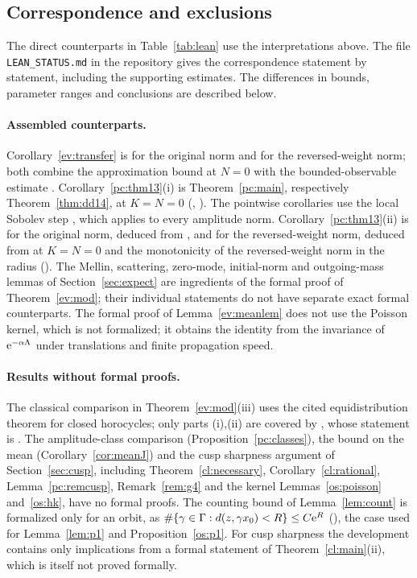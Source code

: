 \subsection{Correspondence and exclusions}
The direct counterparts in Table~\ref{tab:lean} use the interpretations above.
The file \texttt{LEAN\_STATUS.md} in the repository gives the correspondence statement by statement,
including the supporting estimates. The differences in bounds, parameter ranges and conclusions are described below.

\paragraph{Assembled counterparts.}
Corollary~\ref{ev:transfer} is  for the original norm and  for the reversed-weight
norm; both combine the approximation bound at $N=0$ with the bounded-observable estimate .
Corollary~\ref{pc:thm13}(i) is Theorem~\ref{pc:main}, respectively Theorem~\ref{thm:dd14}, at $K=N=0$ (, ). The pointwise
corollaries use the local Sobolev step , which applies to every amplitude norm.
Corollary~\ref{pc:thm13}(ii) is  for the original norm, deduced from , and  for the
reversed-weight norm, deduced from  at $K=N=0$ and the monotonicity of the reversed-weight norm in the radius
(). The Mellin, scattering, zero-mode, initial-norm and outgoing-mass lemmas of
Section~\ref{sec:expect} are ingredients of the formal proof of Theorem~\ref{ev:mod};
their individual statements do not have separate exact formal counterparts. The formal proof of Lemma~\ref{ev:meanlem} does not use
the Poisson kernel, which is not formalized; it obtains the identity from the invariance of $\mathrm{e}^{-\alpha\Lambda}$ under translations and
finite propagation speed.

\paragraph{Results without formal proofs.}
The classical comparison in Theorem~\ref{ev:mod}(iii) uses the cited equidistribution theorem for closed horocycles;
only parts (i),(ii) are covered by , whose statement is .
The amplitude-class comparison (Proposition~\ref{pc:classes}), the bound on the mean (Corollary~\ref{cor:meanJ}) and the cusp
sharpness argument of Section~\ref{sec:cusp}, including Theorem~\ref{cl:necessary}, Corollary~\ref{cl:rational}, Lemma~\ref{pc:remcusp}, Remark~\ref{rem:g4}
and the kernel Lemmas~\ref{os:poisson} and~\ref{os:hk}, have no formal proofs. The counting bound of Lemma~\ref{lem:count} is
formalized only for an orbit, as $\#\{\gamma\in\Gamma:d(z,\gamma x_0)<R\}\le C\mathrm{e}^R$ (), the case used for
Lemma~\ref{lem:p1} and Proposition~\ref{os:p1}.
For cusp sharpness the development contains only implications from a formal statement of Theorem~\ref{cl:main}(ii),
which is itself not proved formally.

